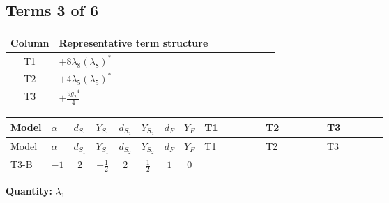 \documentclass[8pt]{article}
\begin{document}
\begin{landscape}
\subsection*{Terms 3 of 6}
\begin{center}
\begin{tabular}{@{}c >{\raggedright\arraybackslash}p{0.82\linewidth}@{}}
\toprule
Column & Representative term structure \\
\midrule
T1 & \(\displaystyle +8 {\lambda_{8}} \left({\lambda_{8}}\right)^{*}\) \\
\midrule
T2 & \(\displaystyle +4 {\lambda_5} \left({\lambda_5}\right)^{*}\) \\
\midrule
T3 & \(\displaystyle +\frac{9 {g_2}^4}{4}\) \\
\midrule
\bottomrule
\end{tabular}
\end{center}
\smallskip
\tiny
\begin{longtable}{@{}llcccccc >{\raggedright\arraybackslash}p{0.21\linewidth} >{\raggedright\arraybackslash}p{0.21\linewidth} >{\raggedright\arraybackslash}p{0.21\linewidth}@{}}
\toprule
Model & $\alpha$ & $d_{S_1}$ & $Y_{S_1}$ & $d_{S_2}$ & $Y_{S_2}$ & $d_F$ & $Y_F$ & T1 & T2 & T3 \\
\midrule
\endfirsthead
\toprule
Model & $\alpha$ & $d_{S_1}$ & $Y_{S_1}$ & $d_{S_2}$ & $Y_{S_2}$ & $d_F$ & $Y_F$ & T1 & T2 & T3 \\
\midrule
\endhead
T3-B & $-1$ & $2$ & $-\frac{1}{2}$ & $2$ & $\frac{1}{2}$ & $1$ & $0$ & \scriptsize\adjustbox{max width=\linewidth}{$\begin{gathered} +8 {\lambda_{8}} \left({\lambda_{8}}\right)^{*}\end{gathered}$} & \scriptsize\adjustbox{max width=\linewidth}{$\begin{gathered} +4 {\lambda_5} \left({\lambda_5}\right)^{*}\end{gathered}$} & \scriptsize\adjustbox{max width=\linewidth}{$\begin{gathered} +\frac{9 {g_2}^4}{4}\end{gathered}$} \\
\midrule
\bottomrule
\end{longtable}
\clearpage
\noindent\textbf{Quantity: }$\lambda_1$\par\smallskip

\end{landscape}
\end{document}
